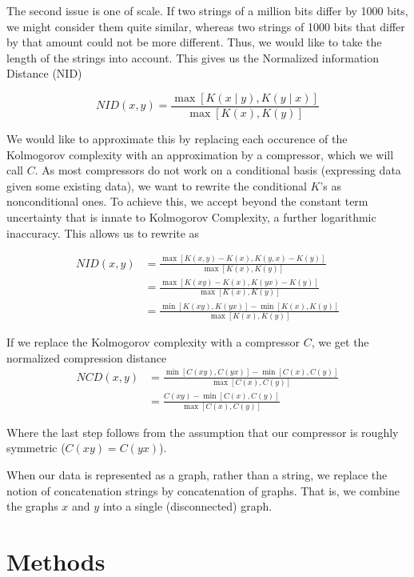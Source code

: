 \documentclass{article}
\begin{document}
The second issue is one of scale. If two strings of a million bits differ by 1000 bits, we might consider them quite similar, whereas two strings of 1000 bits that differ by that amount could not be more different. Thus, we would like to take the length of the strings into account. This gives us the Normalized information Distance (NID)

\[
NID(x, y) = \frac{\max \left [K(x \mid y),K(y \mid x) \right ] }{\max \left [K(x), K(y) \right ]}
\] 

We would like to approximate this by replacing each occurence of the Kolmogorov complexity with an approximation by a compressor, which we will call $C$. As most compressors do not work on a conditional basis (expressing data given some existing data), we want to rewrite the conditional $K$'s as nonconditional ones. To achieve this, we accept beyond the constant term uncertainty that is innate to Kolmogorov Complexity, a further logarithmic inaccuracy. This allows us to rewrite as

\begin{align*}
NID(x, y)	 &= \frac{\max \left [K(x, y) - K(x),K(y, x) - K(y)\right ] }{\max \left [K(x), K(y) \right ]} \\ 
	&= \frac{\max \left [K(xy) - K(x),K(yx) - K(y)\right ] } {\max \left [K(x), K(y) \right ]} \\
	&= \frac{\min \left [K(xy), K(yx)\right ] - \min \left[K(x), K(y)\right]}{\max \left [K(x), K(y) \right ]} 
\end{align*}

If we replace the Kolmogorov complexity with a compressor $C$, we get the normalized compression distance
\begin{align*}
NCD(x, y) 
	&= \frac{\min \left [C(xy), C(yx)\right ] - \min \left[C(x), C(y)\right]}{\max \left [C(x), C(y) \right ]}\\
	&= \frac{C(xy) - \min \left[C(x), C(y)\right]}{\max \left [C(x), C(y) \right ]} 
\end{align*}
 
Where the last step follows from the assumption that our compressor is roughly symmetric ($C(xy) = C(yx)$).

When our data is represented as a graph, rather than a string, we replace the notion of concatenation strings by concatenation of graphs. That is, we combine the graphs $x$ and $y$ into a single (disconnected) graph.

\section*{Methods}
\end{document}
